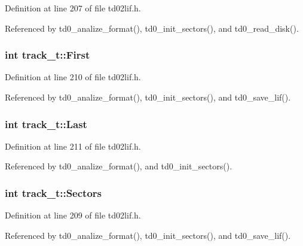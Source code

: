 Definition at line 207 of file td02lif.\+h.



Referenced by td0\+\_\+analize\+\_\+format(), td0\+\_\+init\+\_\+sectors(), and td0\+\_\+read\+\_\+disk().

\subsubsection[{\texorpdfstring{First}{First}}]{\setlength{\rightskip}{0pt plus 5cm}int track\+\_\+t\+::\+First}\hypertarget{structtrack__t_a1ffa3863c3fb622cb158e5275c99c55c}{}\label{structtrack__t_a1ffa3863c3fb622cb158e5275c99c55c}


Definition at line 210 of file td02lif.\+h.



Referenced by td0\+\_\+analize\+\_\+format(), td0\+\_\+init\+\_\+sectors(), and td0\+\_\+save\+\_\+lif().

\subsubsection[{\texorpdfstring{Last}{Last}}]{\setlength{\rightskip}{0pt plus 5cm}int track\+\_\+t\+::\+Last}\hypertarget{structtrack__t_a9ebaf56b7b9c814e5e9c39dea130fa18}{}\label{structtrack__t_a9ebaf56b7b9c814e5e9c39dea130fa18}


Definition at line 211 of file td02lif.\+h.



Referenced by td0\+\_\+analize\+\_\+format(), and td0\+\_\+init\+\_\+sectors().

\subsubsection[{\texorpdfstring{Sectors}{Sectors}}]{\setlength{\rightskip}{0pt plus 5cm}int track\+\_\+t\+::\+Sectors}\hypertarget{structtrack__t_a9a073d98f27d50ffda7991ea8099f269}{}\label{structtrack__t_a9a073d98f27d50ffda7991ea8099f269}


Definition at line 209 of file td02lif.\+h.



Referenced by td0\+\_\+analize\+\_\+format(), td0\+\_\+init\+\_\+sectors(), and td0\+\_\+save\+\_\+lif().

